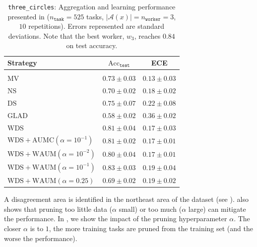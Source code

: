 \begin{table}[tbh]
    \centering
        \begin{tabular}{m{4.9cm}cc}
            Strategy              & $\mathrm{Acc}_{\texttt{test}}$ & ECE                      \\ \hline \\[-0.2cm]
            $\mathrm{MV}$                   & $0.73\pm 0.03$                 & $\mathbf{0.13}\pm 0.03$                         \\
            $\mathrm{NS}$                   & $0.70\pm 0.02$                 & $0.18\pm 0.02$                                  \\
            $\mathrm{DS}$                   & $0.75\pm 0.07$                 & $0.22\pm 0.08$                                \\
            $\mathrm{GLAD}$                 & $0.58\pm 0.02$                 & $0.36\pm 0.02$                             \\
              \rowcolor{gray!20}$\mathrm{WDS}$                  & $0.81\pm 0.04$                 & $0.17\pm 0.03$                                \\
                 \rowcolor{gray!20}$\mathrm{WDS+AUMC}(\alpha=10^{-1})$                  & $0.81\pm 0.02$                 & $0.17\pm 0.01$                                \\
              \rowcolor{gray!20}$\mathrm{WDS+WAUM}(\alpha=10^{-2})$ & $0.80\pm 0.04$                 & $0.17\pm 0.01$\\
              \rowcolor{gray!20}$\mathrm{WDS+WAUM}(\alpha=10^{-1})$ & $\mathbf{0.83}\pm 0.03$        & $0.19\pm 0.04$                             \\
              \rowcolor{gray!20}$\mathrm{WDS+WAUM}(\alpha=0.25)$    & $0.69\pm 0.02$                 & $0.19\pm 0.02$
            \end{tabular}
        \caption{\texttt{three\_circles}: Aggregation and learning performance presented in  ($n_\texttt{task}=525$ tasks, $|\mathcal{A}(x)|=n_\texttt{worker}=3$, $10$ repetitions). Errors represented are standard deviations.
        Note that the best worker, $w_3$, reaches
        $0.84$ on test accuracy.
        }
        \label{tab:res3circles}
\end{table}

A disagreement area is identified in the northeast area of the dataset (see ).
 also shows that pruning too little data ($\alpha$ small) or too much ($\alpha$ large) can mitigate the performance.
In , we show the impact of the pruning hyperparameter $\alpha$. The closer $\alpha$ is to $1$, the more training tasks are pruned from the training set (and the worse the performance).

